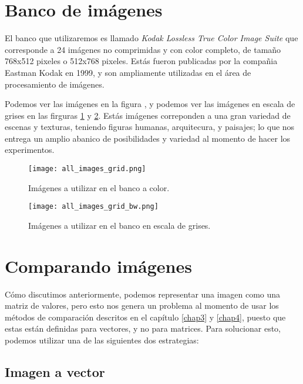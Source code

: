 \section{Banco de im\'agenes}

El banco que utilizaremos es llamado \textit{Kodak Lossless True Color Image Suite
}\cite{KodakLosslessTrueColorImageSuite} que corresponde a 24 im\'agenes no comprimidas y con color completo, de tama\~no 768x512 pixeles o 512x768 pixeles. Est\'as fueron publicadas por la compa\~nia Eastman Kodak en 1999, y son ampliamente utilizadas en el \'area de procesamiento de im\'agenes. 

Podemos ver las im\'agenes en la figura , y podemos ver las im\'agenes en escala de grises en las firguras \ref{fig:banco_color} y \ref{fig:banco_gris}. Est\'as im\'agenes correponden a una gran variedad de escenas y texturas, teniendo figuras humanas, arquitecura, y paisajes; lo que nos entrega un amplio abanico de posibilidades y variedad al momento de hacer los experimentos.

\begin{figure}[H]
    \centering
    \texttt{[image: all\_images\_grid.png]}
    \caption{Im\'agenes a utilizar en el banco a color.}
    \label{fig:banco_color}
\end{figure}

\begin{figure}[H]
    \centering
    \texttt{[image: all\_images\_grid\_bw.png]}
    \caption{Im\'agenes a utilizar en el banco en escala de grises.}
    \label{fig:banco_gris}
\end{figure}


\section{Comparando im\'agenes}

Cómo discutimos anteriormente, podemos representar una imagen como una matriz de valores, pero esto nos genera un problema al momento de usar los m\'etodos de comparaci\'on descritos en el cap\'itulo \ref{chap3} y \ref{chap4}, puesto que estas est\'an definidas para vectores, y no para matrices. Para solucionar esto, podemos utilizar una de las siguientes dos estrategias:

\subsection{Imagen a vector}

